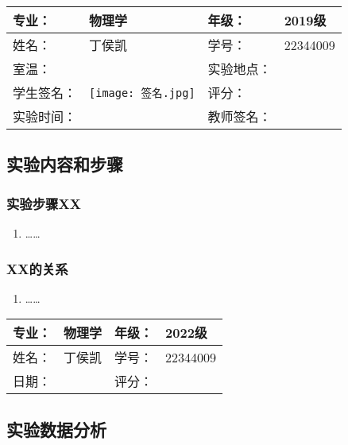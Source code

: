 \documentclass[dvipsnames, svgnames,a4paper,11pt]{article}
\begin{document}
\clearpage
\begin{table}
	\renewcommand\arraystretch{1.7}
	\centering
	\begin{tabularx}{\textwidth}{|X|X|X|X|}
	\hline
	专业：& 物理学 &年级：& 2019级 \\
	\hline
	姓名： & 丁侯凯& 学号：&22344009\\
	\hline
	室温：& & 实验地点： & \\
	\hline
	学生签名：& \texttt{[image: 签名.jpg]}      & 评分： &\\
	\hline
	实验时间：& & 教师签名：&\\
	\hline
	\end{tabularx}
\end{table}

\subsection{实验内容和步骤}
	\subsubsection{实验步骤XX}
		\begin{enumerate}
		\item ……
		\end{enumerate}


	\subsubsection{XX的关系}
		\begin{enumerate}
		\item ……
		\end{enumerate}

		
\clearpage
\begin{table}
	\renewcommand\arraystretch{1.7}
	\begin{tabularx}{\textwidth}{|X|X|X|X|}
	\hline
	专业：& 物理学 &年级：& 2022级\\
	\hline
	姓名： &丁侯凯 & 学号：&22344009 \\
	\hline
    日期：& & 评分： &\\
	\hline
	\end{tabularx}
\end{table}

\subsection{实验数据分析}
\end{document}
